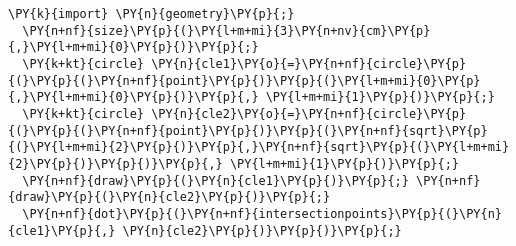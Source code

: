 \begin{Verbatim}[commandchars=\\\{\}]
  \PY{k}{import} \PY{n}{geometry}\PY{p}{;}
  \PY{n+nf}{size}\PY{p}{(}\PY{l+m+mi}{3}\PY{n+nv}{cm}\PY{p}{,}\PY{l+m+mi}{0}\PY{p}{)}\PY{p}{;}
  \PY{k+kt}{circle} \PY{n}{cle1}\PY{o}{=}\PY{n+nf}{circle}\PY{p}{(}\PY{p}{(}\PY{n+nf}{point}\PY{p}{)}\PY{p}{(}\PY{l+m+mi}{0}\PY{p}{,}\PY{l+m+mi}{0}\PY{p}{)}\PY{p}{,} \PY{l+m+mi}{1}\PY{p}{)}\PY{p}{;}
  \PY{k+kt}{circle} \PY{n}{cle2}\PY{o}{=}\PY{n+nf}{circle}\PY{p}{(}\PY{p}{(}\PY{n+nf}{point}\PY{p}{)}\PY{p}{(}\PY{n+nf}{sqrt}\PY{p}{(}\PY{l+m+mi}{2}\PY{p}{)}\PY{p}{,}\PY{n+nf}{sqrt}\PY{p}{(}\PY{l+m+mi}{2}\PY{p}{)}\PY{p}{)}\PY{p}{,} \PY{l+m+mi}{1}\PY{p}{)}\PY{p}{;}
  \PY{n+nf}{draw}\PY{p}{(}\PY{n}{cle1}\PY{p}{)}\PY{p}{;} \PY{n+nf}{draw}\PY{p}{(}\PY{n}{cle2}\PY{p}{)}\PY{p}{;}
  \PY{n+nf}{dot}\PY{p}{(}\PY{n+nf}{intersectionpoints}\PY{p}{(}\PY{n}{cle1}\PY{p}{,} \PY{n}{cle2}\PY{p}{)}\PY{p}{)}\PY{p}{;}
\end{Verbatim}
